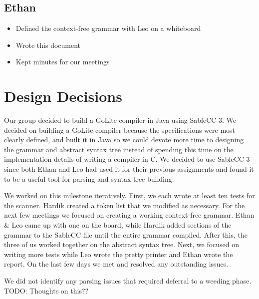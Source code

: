 \documentclass{article}
\begin{document}
\subsection*{Ethan}

\begin{itemize}
    \item Defined the context-free grammar with Leo on a whiteboard
    \item Wrote this document
    \item Kept minutes for our meetings
\end{itemize}

\section*{Design Decisions}

Our group decided to build a GoLite compiler in Java using SableCC 3. We decided on building a GoLite compiler because the specifications were most clearly defined, and built it in Java so we could devote more time to designing the grammar and abstract syntax tree instead of spending this time on the implementation details of writing a compiler in C. We decided to use SableCC 3 since both Ethan and Leo had used it for their previous assignments and found it to be a useful tool for parsing and syntax tree building.

We worked on this milestone iteratively. First, we each wrote at least ten tests for the scanner. Hardik created a token list that we modified as necessary. For the next few meetings we focused on creating a working context-free grammar. Ethan \& Leo came up with one on the board, while Hardik added sections of the grammar to the SableCC file until the entire grammar compiled. After this, the three of us worked together on the abstract syntax tree. Next, we focused on writing more tests while Leo wrote the pretty printer and Ethan wrote the report. On the last few days we met and resolved any outstanding issues.

We did not identify any parsing issues that required deferral to a weeding phase. TODO: Thoughts on this??
\end{document}
